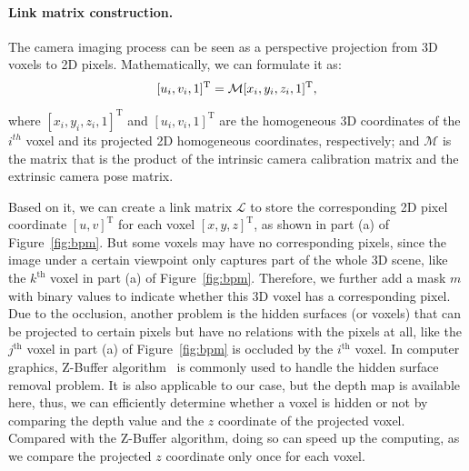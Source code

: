 \documentclass[final]{cvpr}
\begin{document}
\vspace{-4mm}
\paragraph{Link matrix construction.}
The camera imaging process can be seen as a perspective projection from 3D voxels to 2D pixels.
Mathematically, we can formulate it as:
\begin{equation}
	\vspace{-1mm}
	[u_i,v_i,1]^\text{T} = \mathcal{M}[x_i,y_i,z_i ,1]^\text{T},
	\label{eq:camera}
	\vspace{-1mm}
\end{equation}

where $[x_i,y_i,z_i ,1]^\text{T}$ and $[u_i,v_i,1]^\text{T}$ are the homogeneous 3D coordinates of the $i^{th}$ voxel and its projected 2D homogeneous coordinates, respectively; and $\mathcal{M}$ is the matrix that is the product of the intrinsic camera calibration matrix and the extrinsic camera pose matrix.


Based on it, we can create a link matrix $\mathcal{L}$ to store the corresponding 2D pixel coordinate $[u,v]^\text{T}$ for each voxel $[x,y,z]^\text{T}$, as shown in part (a) of Figure~\ref{fig:bpm}.
But some voxels may have no corresponding pixels, since the image under a certain viewpoint only captures part of the whole 3D scene, like the $k^\text{th}$ voxel in part (a) of Figure~\ref{fig:bpm}.
Therefore, we further add a mask $m$ with binary values to indicate whether this 3D voxel has a corresponding pixel.
Due to the occlusion, another problem is the hidden surfaces (or voxels) that can be projected to certain pixels but have no relations with the pixels at all, like the $j^\text{th}$ voxel in part (a) of Figure~\ref{fig:bpm} is occluded by the $i^\text{th}$ voxel.
In computer graphics, Z-Buffer algorithm~\cite{catmull1974subdivision} is commonly used to handle the hidden surface removal problem.
It is also applicable to our case, but the depth map is available here, thus, we can efficiently determine whether a voxel is hidden or not by comparing the depth value and the $z$ coordinate of the projected voxel.
Compared with the Z-Buffer algorithm, doing so can speed up the computing, as we compare the projected $z$ coordinate only once for each voxel.
\end{document}
